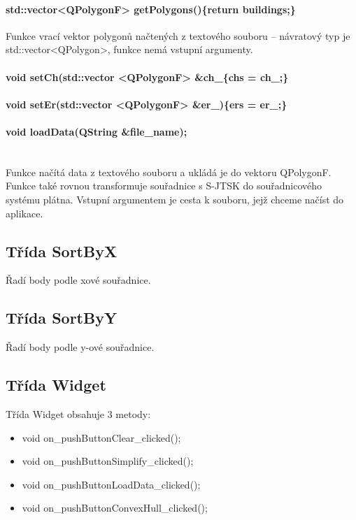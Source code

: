 \documentclass[11pt]{article}
\begin{document}
	 	\paragraph{std::vector<QPolygonF> getPolygons()\{return buildings;\}}
	 	
	 	Funkce vrací vektor polygonů načtených z textového souboru – návratový typ je std::vector<QPolygon>, funkce nemá vstupní argumenty.
	 	
	 	\paragraph{void setCh(std::vector <QPolygonF> \&ch\_\{chs = ch\_;\}}
	 	
	 	\paragraph{void setEr(std::vector <QPolygonF> \&er\_)\{ers = er\_;\}}
	 	
	 	\paragraph{void loadData(QString \&file\_name);}\mbox{}\\
	 	Funkce načítá data z textového souboru a ukládá je do vektoru QPolygonF. Funkce také rovnou transformuje souřadnice s S-JTSK do souřadnicového systému plátna. Vstupní argumentem je cesta k souboru, jejž chceme načíst do aplikace.   
	 	
	 	\subsection{Třída SortByX}
	 	Řadí body podle xové souřadnice.
	 	
	 	\subsection{Třída SortByY}
	 	Řadí body podle y-ové souřadnice.
	 	
	 	\subsection{Třída Widget}
	 	Třída Widget obsahuje 3 metody:
	 	
	 	\begin{itemize}
	 		\item void on\_pushButtonClear\_clicked();
	 		\item void on\_pushButtonSimplify\_clicked();
	 		\item void on\_pushButtonLoadData\_clicked();
	 		\item void on\_pushButtonConvexHull\_clicked();
	 		
	 	\end{itemize}
	 	
\end{document}
